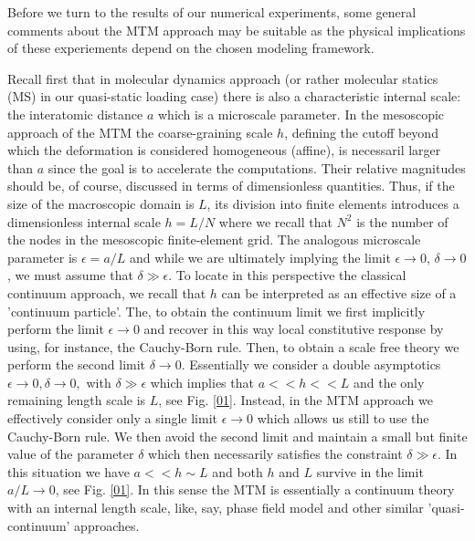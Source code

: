 \documentclass[aps,
superscriptaddress,notitlepage]{revtex4-1}
\begin{document}

Before we turn to the results of our numerical experiments, some general comments about the MTM approach may be suitable as the physical implications of these experiements depend on the chosen modeling framework.  

 Recall first that in molecular dynamics approach (or rather molecular statics  (MS) in our quasi-static loading case)  there is also a characteristic internal scale: the  interatomic distance $a$ which is a microscale parameter.  In the mesoscopic approach of the MTM  the   coarse-graining scale  $h$, defining the  cutoff beyond which the deformation is considered homogeneous (affine), is necessaril larger than $a$ since  the goal is to   accelerate the computations. Their relative  magnitudes  should be, of course, discussed in terms of dimensionless quantities.  Thus, if the size of the macroscopic domain is  $L$, its  division  into finite elements introduces a dimensionless internal scale   $ h = L/N $ where we recall that $N^2$ is the number  of the nodes in the mesoscopic finite-element grid. The analogous microscale parameter is $\epsilon=a/L$ and  while we are ultimately implying the limit $\epsilon \to 0$, $\delta \to 0$, we must assume that $\delta\gg\epsilon$.  To locate in this perspective  the  classical continuum approach, we recall that  $h$ can be interpreted as an effective  size of a 'continuum particle'.  The, to obtain the continuum limit we first implicitly perform the limit $\epsilon \to 0$ and recover in this way local constitutive response  by using, for instance, the  Cauchy-Born rule. Then, to obtain a scale free theory we  perform the second limit $\delta \to 0$. Essentially we consider  a double   asymptotics 
$
   \epsilon \to 0,  \delta \to 0 ,
$
with $\delta\gg\epsilon$ which implies that $a<<h<<L$ and the only remaining length scale is $L$, see Fig. \ref{01}. Instead, in the MTM approach we effectively consider only a single limit $ \epsilon \to 0$ which  allows us still to use the Cauchy-Born rule. We then avoid the second limit and maintain a  small but finite value of the parameter $\delta$ which then necessarily satisfies  the  constraint $\delta\gg\epsilon$. In this situation we have  $a<<h \sim L$ and both $h$ and $L$ survive in the  limit $a/L \to 0$, see  Fig. \ref{01}. In this sense the MTM is essentially a continuum theory with an internal length scale, like, say, phase field model and other similar 'quasi-continuum' approaches.  
\end{document}
